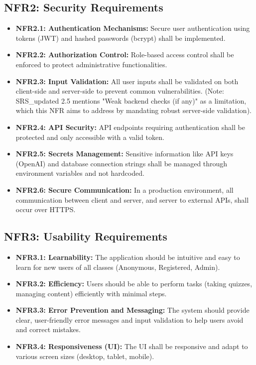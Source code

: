 \subsection{NFR2: Security Requirements}
\begin{itemize}
    \item \textbf{NFR2.1: Authentication Mechanisms:} Secure user authentication using tokens (JWT) and hashed passwords (bcrypt) shall be implemented.
    \item \textbf{NFR2.2: Authorization Control:} Role-based access control shall be enforced to protect administrative functionalities.
    \item \textbf{NFR2.3: Input Validation:} All user inputs shall be validated on both client-side and server-side to prevent common vulnerabilities. (Note: SRS\_updated 2.5 mentions "Weak backend checks (if any)" as a limitation, which this NFR aims to address by mandating robust server-side validation).
    \item \textbf{NFR2.4: API Security:} API endpoints requiring authentication shall be protected and only accessible with a valid token.
    \item \textbf{NFR2.5: Secrets Management:} Sensitive information like API keys (OpenAI) and database connection strings shall be managed through environment variables and not hardcoded.
    \item \textbf{NFR2.6: Secure Communication:} In a production environment, all communication between client and server, and server to external APIs, shall occur over HTTPS.
\end{itemize}

\subsection{NFR3: Usability Requirements}
\begin{itemize}
    \item \textbf{NFR3.1: Learnability:} The application should be intuitive and easy to learn for new users of all classes (Anonymous, Registered, Admin).
    \item \textbf{NFR3.2: Efficiency:} Users should be able to perform tasks (taking quizzes, managing content) efficiently with minimal steps.
    \item \textbf{NFR3.3: Error Prevention and Messaging:} The system should provide clear, user-friendly error messages and input validation to help users avoid and correct mistakes.
    \item \textbf{NFR3.4: Responsiveness (UI):} The UI shall be responsive and adapt to various screen sizes (desktop, tablet, mobile).
\end{itemize}

